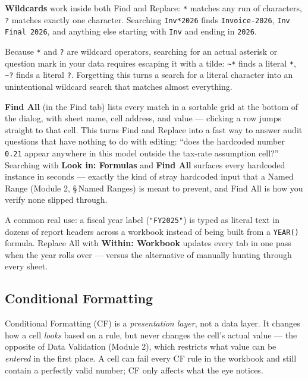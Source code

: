 \documentclass[11pt,a4paper]{article}
\begin{document}
\textbf{Wildcards} work inside both Find and Replace: \texttt{*} matches any run of characters, \texttt{?} matches exactly one character. Searching \texttt{Inv*2026} finds \texttt{Invoice-2026}, \texttt{Inv Final 2026}, and anything else starting with \texttt{Inv} and ending in \texttt{2026}.

\begin{pitfall}
Because \texttt{*} and \texttt{?} are wildcard operators, searching for an actual asterisk or question mark in your data requires escaping it with a tilde: \texttt{\textasciitilde{}*} finds a literal \texttt{*}, \texttt{\textasciitilde{}?} finds a literal \texttt{?}. Forgetting this turns a search for a literal character into an unintentional wildcard search that matches almost everything.
\end{pitfall}

\begin{protip}
\textbf{Find All} (in the Find tab) lists every match in a sortable grid at the bottom of the dialog, with sheet name, cell address, and value --- clicking a row jumps straight to that cell. This turns Find and Replace into a fast way to answer audit questions that have nothing to do with editing: ``does the hardcoded number \texttt{0.21} appear anywhere in this model outside the tax-rate assumption cell?'' Searching with \textbf{Look in: Formulas} and \textbf{Find All} surfaces every hardcoded instance in seconds --- exactly the kind of stray hardcoded input that a Named Range (Module 2, \S\,Named Ranges) is meant to prevent, and Find All is how you verify none slipped through.
\end{protip}

\begin{financeapp}
A common real use: a fiscal year label (\texttt{"FY2025"}) is typed as literal text in dozens of report headers across a workbook instead of being built from a \texttt{YEAR()} formula. Replace All with \textbf{Within: Workbook} updates every tab in one pass when the year rolls over --- versus the alternative of manually hunting through every sheet.
\end{financeapp}

\subsection{Conditional Formatting}
\label{sec:condformat}

\begin{keyconcept}
Conditional Formatting (CF) is a \emph{presentation layer}, not a data layer. It changes how a cell \emph{looks} based on a rule, but never changes the cell's actual value --- the opposite of Data Validation (Module 2), which restricts what value can be \emph{entered} in the first place. A cell can fail every CF rule in the workbook and still contain a perfectly valid number; CF only affects what the eye notices.
\end{keyconcept}
\end{document}
